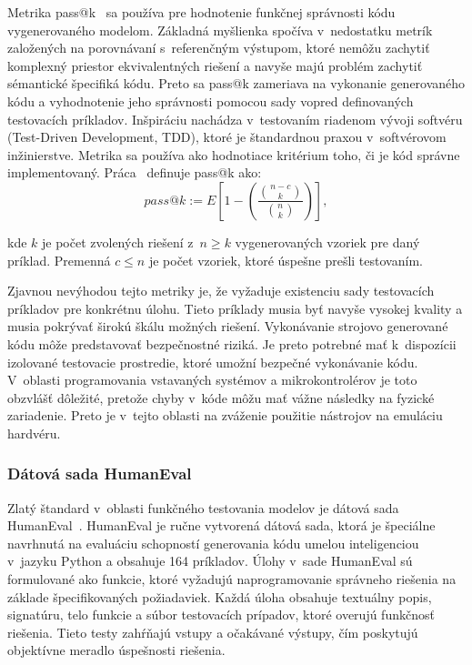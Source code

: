 Metrika pass@k~\cite{kulal2019spoc} sa používa pre hodnotenie funkčnej správnosti kódu vygenerovaného modelom. Základná myšlienka spočíva v~nedostatku metrík založených na porovnávaní s~referenčným výstupom, ktoré nemôžu zachytiť komplexný priestor ekvivalentných riešení a navyše majú problém zachytiť sémantické špecifiká kódu. Preto sa pass@k zameriava na vykonanie generovaného kódu a vyhodnotenie jeho správnosti pomocou sady vopred definovaných testovacích príkladov. Inšpiráciu nachádza v~testovaním riadenom vývoji softvéru (Test-Driven Development, TDD), ktoré je štandardnou praxou v~softvérovom inžinierstve. Metrika sa používa ako hodnotiace kritérium toho, či je kód správne implementovaný. Práca~\cite{chen2021evaluating} definuje pass@k ako:
$$
pass@k := E\left[1 - \left(\frac{\binom{n-c}{k}}{\binom{n}{k}}\right)\right],
$$

\noindent kde $k$ je počet zvolených riešení z~$n \geq k$ vygenerovaných vzoriek pre daný príklad. Premenná $c \leq n$ je počet vzoriek, ktoré úspešne prešli testovaním.

Zjavnou nevýhodou tejto metriky je, že vyžaduje existenciu sady testovacích príkladov pre konkrétnu úlohu. Tieto príklady musia byť navyše vysokej kvality a musia pokrývať širokú škálu možných riešení. Vykonávanie strojovo generované kódu môže predstavovať bezpečnostné riziká. Je preto potrebné mať k~dispozícii izolované testovacie prostredie, ktoré umožní bezpečné vykonávanie kódu. V~oblasti programovania vstavaných systémov a mikrokontrolérov je toto obzvlášť dôležité, pretože chyby v~kóde môžu mať vážne následky na fyzické zariadenie. Preto je v~tejto oblasti na zváženie použitie nástrojov na emuláciu hardvéru.

\subsubsection{Dátová sada HumanEval}

Zlatý štandard v~oblasti funkčného testovania modelov je dátová sada HumanEval~\cite{chen2021evaluating}. HumanEval je ručne vytvorená dátová sada, ktorá je špeciálne navrhnutá na evaluáciu schopností generovania kódu umelou inteligenciou v~jazyku Python a obsahuje 164 príkladov. Úlohy v~sade HumanEval sú formulované ako funkcie, ktoré vyžadujú naprogramovanie správneho riešenia na základe špecifikovaných požiadaviek. Každá úloha obsahuje textuálny popis, signatúru, telo funkcie a súbor testovacích prípadov, ktoré overujú funkčnosť riešenia. Tieto testy zahŕňajú vstupy a očakávané výstupy, čím poskytujú objektívne meradlo úspešnosti riešenia.


